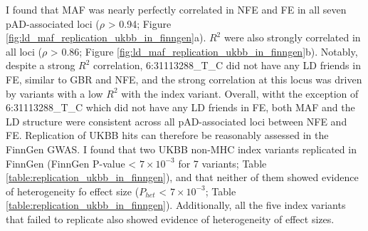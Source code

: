I found that MAF was nearly perfectly correlated in NFE and FE in all seven pAD-associated loci ($\rho$ > 0.94; Figure \ref{fig:ld_maf_replication_ukbb_in_finngen}a). $R^{2}$ were also strongly correlated in all loci ($\rho$ > 0.86; Figure \ref{fig:ld_maf_replication_ukbb_in_finngen}b). Notably, despite a strong $R^{2}$ correlation, 6:31113288\_T\_C did not have any LD friends in FE, similar to GBR and NFE, and the strong correlation at this locus was driven by variants with a low $R^{2}$ with the index variant. Overall, witht the exception of 6:31113288\_T\_C which did not have any LD friends in FE, both MAF and the LD structure were consistent across all pAD-associated loci between NFE and FE. Replication of UKBB hits can therefore be reasonably assessed in the FinnGen GWAS. I found that two UKBB non-MHC index variants replicated in FinnGen (FinnGen P-value < $7\times10^{-3}$ for 7 variants; Table \ref{table:replication_ukbb_in_finngen}), and that neither of them showed evidence of heterogeneity fo effect size ($P_{het}$ < $7\times10^{-3}$; Table \ref{table:replication_ukbb_in_finngen}). Additionally, all the five index variants that failed to replicate also showed evidence of heterogeneity of effect sizes.


